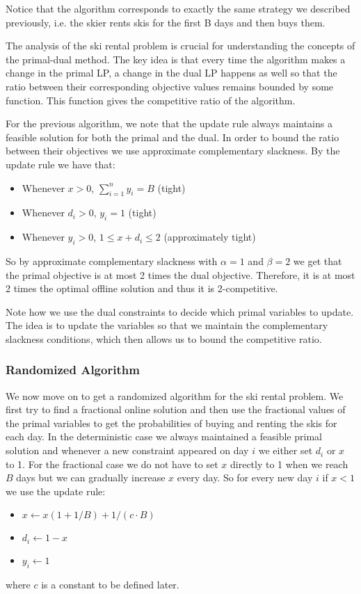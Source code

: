 Notice that the algorithm corresponds to exactly the same strategy we described previously, i.e. the skier rents skis for the first B days and then buys them.


The analysis of the ski rental problem is crucial for understanding the concepts of the primal-dual method. 
The key idea is that every time the algorithm makes a change in the primal LP, a change in the dual LP happens as well so that the ratio between their corresponding objective values remains bounded by some function. 
This function gives the competitive ratio of the algorithm.

For the previous algorithm, we note that the update rule always maintains a feasible solution for both the primal and the dual. 
In order to bound the ratio between their objectives we use approximate complementary slackness. 
By the update rule we have that:
\begin{itemize}
\item Whenever $x > 0$, $\sum^n_{i=1} y_i = B$ (tight)
\item Whenever $d_i > 0$, $y_i = 1$ (tight)
\item Whenever $y_i > 0$, $1 \le x+d_i \le 2$ (approximately tight)
\end{itemize}

So by approximate complementary slackness with $\alpha = 1$ and $\beta = 2$ we get that the primal objective is at most 2 times the dual objective. Therefore, it is at most 2 times the optimal offline solution and thus it is 2-competitive.

Note how we use the dual constraints to decide which primal variables to update.
The idea is to update the variables so that we maintain the complementary slackness conditions, which then allows us to bound the competitive ratio.

\subsubsection{Randomized Algorithm}
We now move on to get a randomized algorithm for the ski rental problem. 
We first try to find a fractional online solution and then use the fractional values of the primal variables to get the probabilities of buying and renting the skis for each day.
In the deterministic case we always maintained a feasible primal solution and whenever a new constraint appeared on day $i$ we either set $d_i$ or $x$ to 1. For the fractional case we do not have to set $x$ directly to 1 when we reach $B$ days but we can gradually increase $x$ every day. So for every new day $i$ if $x<1$ we use the update rule:
\begin{itemize}
\item $x \leftarrow x(1+1/B) + 1/(c\cdot B)$
\item $d_i \leftarrow 1 - x$
\item $y_i \leftarrow 1$
\end{itemize}
where $c$ is a constant to be defined later.

